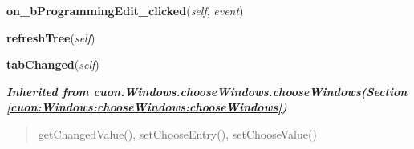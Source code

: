     \vspace{0.5ex}

\hspace{.8\funcindent}\begin{boxedminipage}{\funcwidth}

    \raggedright \textbf{on\_bProgrammingEdit\_clicked}(\textit{self}, \textit{event})

\setlength{\parskip}{2ex}
\setlength{\parskip}{1ex}
    \end{boxedminipage}

    \label{cuon:Project:project:projectwindow:refreshTree}

    \vspace{0.5ex}

\hspace{.8\funcindent}\begin{boxedminipage}{\funcwidth}

    \raggedright \textbf{refreshTree}(\textit{self})

\setlength{\parskip}{2ex}
\setlength{\parskip}{1ex}
    \end{boxedminipage}

    \label{cuon:Project:project:projectwindow:tabChanged}

    \vspace{0.5ex}

\hspace{.8\funcindent}\begin{boxedminipage}{\funcwidth}

    \raggedright \textbf{tabChanged}(\textit{self})

\setlength{\parskip}{2ex}
\setlength{\parskip}{1ex}
    \end{boxedminipage}


\large{\textbf{\textit{Inherited from cuon.Windows.chooseWindows.chooseWindows\textit{(Section \ref{cuon:Windows:chooseWindows:chooseWindows})}}}}

\begin{quote}
getChangedValue(), setChooseEntry(), setChooseValue()
\end{quote}

